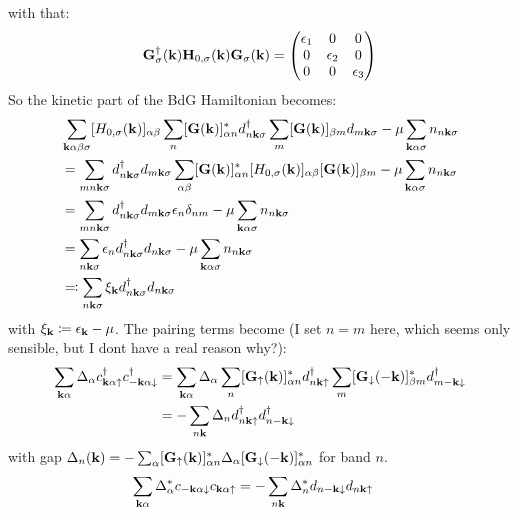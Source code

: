 \documentclass[../main.tex]{subfiles}
\begin{document}
with that:
\begin{equation}
    \textbf{G}^{\dagger}_{\sigma} (\bm{\mathrm{k}}) \textbf{H}_{0, \sigma} (\bm{\mathrm{k}}) \textbf{G}_{\sigma} (\bm{\mathrm{k}}) =
    \begin{pmatrix}
        \epsilon_1 & 0 & 0 \\
        0 & \epsilon_2 & 0 \\
        0 & 0 & \epsilon_3
    \end{pmatrix}
\end{equation}
So the kinetic part of the BdG Hamiltonian becomes:
\begin{align}
    &\sum_{\bm{\mathrm{k}} \alpha \beta \sigma} [H_{0, \sigma} (\bm{\mathrm{k}})]_{\alpha \beta}
    \sum_{n} [\textbf{G} (\bm{\mathrm{k}})]_{\alpha n}^* d_{n \bm{\mathrm{k}} \sigma}^{\dagger}
    \sum_{m} [\textbf{G} (\bm{\mathrm{k}})]_{\beta m} d_{m \bm{\mathrm{k}} \sigma}
    -\mu \sum_{\bm{\mathrm{k}} \alpha \sigma} n_{n \bm{\mathrm{k}} \sigma} \\
    &= \sum_{m n \bm{\mathrm{k}} \sigma} d_{n \bm{\mathrm{k}} \sigma}^{\dagger} d_{m \bm{\mathrm{k}} \sigma}
   \sum_{\alpha \beta} [\textbf{G} (\bm{\mathrm{k}})]_{\alpha n}^* [H_{0, \sigma} (\bm{\mathrm{k}})]_{\alpha \beta} [\textbf{G} (\bm{\mathrm{k}})]_{\beta m}
    -\mu \sum_{\bm{\mathrm{k}} \alpha \sigma} n_{n \bm{\mathrm{k}} \sigma} \\
    &= \sum_{m n \bm{\mathrm{k}} \sigma} d_{n \bm{\mathrm{k}} \sigma}^{\dagger} d_{m \bm{\mathrm{k}} \sigma} \epsilon_{n} \delta_{n m}
    -\mu \sum_{\bm{\mathrm{k}} \alpha \sigma} n_{n \bm{\mathrm{k}} \sigma} \\
    &= \sum_{n \bm{\mathrm{k}} \sigma} \epsilon_{n} d_{n \bm{\mathrm{k}} \sigma}^{\dagger} d_{n \bm{\mathrm{k}} \sigma}
    -\mu \sum_{\bm{\mathrm{k}} \alpha \sigma} n_{n \bm{\mathrm{k}} \sigma} \\
    &\eqqcolon \sum_{n \bm{\mathrm{k}} \sigma} \xi_{\bm{\mathrm{k}}} d_{n \bm{\mathrm{k}} \sigma}^{\dagger} d_{n \bm{\mathrm{k}} \sigma}
\end{align}
with \(\xi_{\bm{\mathrm{k}}} \coloneqq \epsilon_{\bm{\mathrm{k}}} - \mu\).
The pairing terms become (I set \(n = m\) here, which seems only sensible, but I dont have a real reason why?):
\begin{align}
    \sum_{\bm{\mathrm{k}} \alpha} \Delta_{\alpha} c_{\bm{\mathrm{k}} \alpha \uparrow}^{\dagger} c_{-\bm{\mathrm{k}} \alpha \downarrow}^{\dagger}
    &= \sum_{\bm{\mathrm{k}} \alpha} \Delta_{\alpha} \sum_n [\textbf{G}_{\uparrow} (\bm{\mathrm{k}})]_{\alpha n}^* d_{n \bm{\mathrm{k}} \uparrow}^{\dagger} \sum_m [\textbf{G}_{\downarrow} (-\bm{\mathrm{k}})]_{\beta m}^* d_{m -\bm{\mathrm{k}} \downarrow}^{\dagger} \\
    &= -\sum_{n \bm{\mathrm{k}}} \Delta_n d_{n \bm{\mathrm{k}} \uparrow}^{\dagger} d_{n -\bm{\mathrm{k}} \downarrow}^{\dagger}
\end{align}
with gap \(\Delta_n (\bm{\mathrm{k}}) = -\sum_{\alpha} [\textbf{G}_{\uparrow} (\bm{\mathrm{k}})]_{\alpha n}^* \Delta_{\alpha} [\textbf{G}_{\downarrow} (-\bm{\mathrm{k}})]_{\alpha n}^*\) for band \(n\).
\begin{align}
    \sum_{\bm{\mathrm{k}} \alpha} \Delta_{\alpha}^* c_{-\bm{\mathrm{k}} \alpha \downarrow} c_{\bm{\mathrm{k}} \alpha \uparrow}
    &= -\sum_{n \bm{\mathrm{k}}} \Delta_n^* d_{n -\bm{\mathrm{k}} \downarrow} d_{n \bm{\mathrm{k}} \uparrow}
\end{align}
\end{document}
